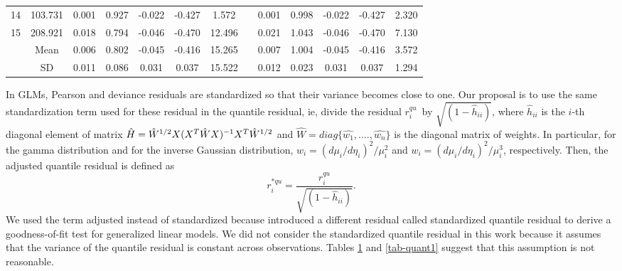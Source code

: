 \documentclass[11pt,authoryear,review,3p,times]{elsarticle}
\newcommand{\qu}{$r_i^{qu}$}
\begin{document}
\begin{table}[h!]
{\begin{tabular}{ccccccccccccc}
 		14    & 103.731 & 0.001 & 0.927 & -0.022 & -0.427 & 1.572 &       & 0.001 & 0.998 & -0.022 & -0.427 & 2.320 \\
 		15    & 208.921 & 0.018 & 0.794 & -0.046 & -0.470 & 12.496 &       & 0.021 & 1.043 & -0.046 & -0.470 & 7.130 \\
 		\hline
 		& Mean  & 0.006 & 0.802 & -0.045 & -0.416 & 15.265 &       & 0.007 & 1.004 & -0.045 & -0.416 & 3.572 \\
 		& SD    & 0.011 & 0.086 & 0.031 & 0.037 & 15.522 &       & 0.012 & 0.023 & 0.031 & 0.037 & 1.294 \\
 		\hline	
 		\end{tabular}%
 	}
 	\label{tab-quant}%
 \end{table}%



In GLMs, Pearson and deviance residuals are standardized so that their variance becomes close to one.
Our proposal is	to use the same standardization term used for these residual in the quantile residual, ie, divide the residual \qu \, by $\sqrt{(1-\hat{h}_{ii})}$, where  $\hat{h}_{ii}$ is the $i$-th diagonal element of matrix  $\hat{\boldmath{H}}=\hat{W}^{1/2}X(X^T\hat{W}X)^{-1}X^T\hat{W}^{1/2}$ and $\hat{W}=diag\{\hat{w_1},....,\hat{w_n}\}$ is the diagonal matrix of weights.
In particular, for the gamma distribution and for the inverse Gaussian distribution, $w_i=({d\mu_i}/{d\eta_i})^2/\mu_i^2$ and $w_i=({d\mu_i}/{d\eta_i})^2/\mu_i^3$, respectively. 
 Then, the adjusted quantile residual is defined as
\begin{equation}
r_i^{*qu} = \frac{r_i^{qu}}{\sqrt{(1-\hat{h}_{ii})}}.
\end{equation}
We used the term adjusted instead of standardized because \cite{klar2012specification} introduced a different residual called standardized quantile
residual to derive a goodness-of-fit test for generalized linear models. We did not consider the standardized quantile
residual in this work because it assumes that the variance of the quantile residual is constant across observations. Tables \ref{tab-quant} and \ref{tab-quant1} suggest that this assumption is not reasonable.
\end{document}
